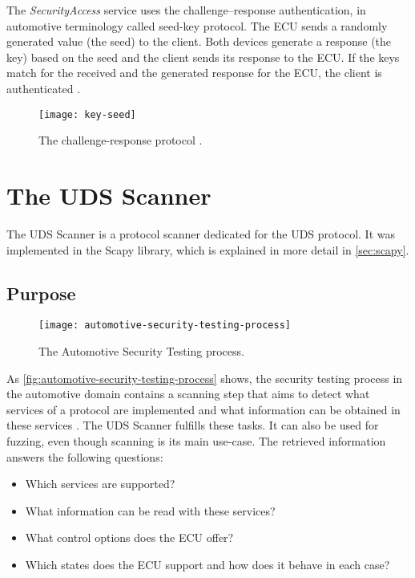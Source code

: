 The \emph{SecurityAccess} service uses the challenge–response authentication, in automotive terminology called seed-key protocol. The ECU sends a randomly generated value (the seed) to the client. Both devices generate a response (the key) based on the seed and the client sends its response to the ECU. If the keys match for the received and the generated response for the ECU, the client is authenticated \cite{iso14229}.

\begin{figure}[htb]
    \centering
    \texttt{[image: key-seed]}
    \caption{The challenge-response protocol \cite{Herrewegen2018}.}
    \label{fig:key-seed}
\end{figure}


\section{The UDS Scanner}
\label{sec:uds-scanner}

The UDS Scanner is a protocol scanner dedicated for the UDS protocol. It was implemented in the Scapy library, which is explained in more detail in \autoref{sec:scapy}.

\subsection{Purpose}

\begin{figure}[htb]
    \centering
    \texttt{[image: automotive-security-testing-process]}
    \caption{The Automotive Security Testing process.}
    \label{fig:automotive-security-testing-process}
\end{figure}

As \autoref{fig:automotive-security-testing-process} shows, the security testing process in the automotive domain contains a scanning step that aims to detect what services of a protocol are implemented and what information can be obtained in these services \cite{Bayer2015}. The UDS Scanner fulfills these tasks. It can also be used for fuzzing, even though scanning is its main use-case. The retrieved information answers the following questions:

\begin{itemize}
\item Which services are supported?
\item What information can be read with these services?
\item What control options does the ECU offer?
\item Which states does the ECU support and how does it behave in each case?
\end{itemize}


